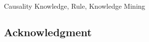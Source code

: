 \documentclass[conference]{IEEEtran}
\begin{document}
\begin{IEEEkeywords}
Causality Knowledge, Rule, Knowledge Mining
\end{IEEEkeywords}
\begin{CJK}{UTF8}{gkai}






\section{Acknowledgment}


\end{CJK}
\end{document}
